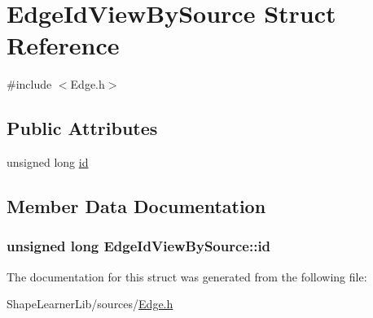 \hypertarget{struct_edge_id_view_by_source}{}\section{Edge\+Id\+View\+By\+Source Struct Reference}
\label{struct_edge_id_view_by_source}


{\ttfamily \#include $<$Edge.\+h$>$}

\subsection*{Public Attributes}
\begin{DoxyCompactItemize}
\item 
unsigned long \hyperlink{struct_edge_id_view_by_source_a4cfe54b2307a1a22f45ee037215f2fb3}{id}
\end{DoxyCompactItemize}


\subsection{Member Data Documentation}
\hypertarget{struct_edge_id_view_by_source_a4cfe54b2307a1a22f45ee037215f2fb3}{}
\subsubsection[{id}]{\setlength{\rightskip}{0pt plus 5cm}unsigned long Edge\+Id\+View\+By\+Source\+::id}\label{struct_edge_id_view_by_source_a4cfe54b2307a1a22f45ee037215f2fb3}


The documentation for this struct was generated from the following file\+:\begin{DoxyCompactItemize}
\item 
Shape\+Learner\+Lib/sources/\hyperlink{_edge_8h}{Edge.\+h}\end{DoxyCompactItemize}
